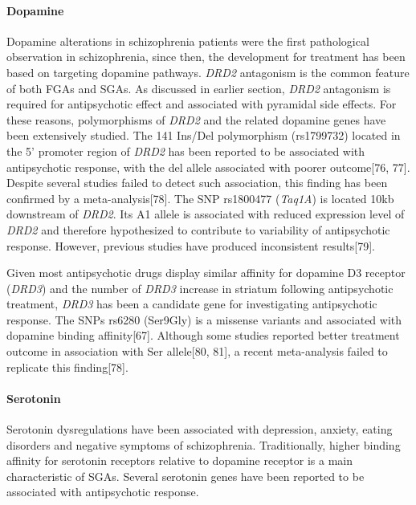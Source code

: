 \documentclass[12pt]{report}
\newcommand{\gene}[1]{\textit{#1}}
\begin{document}
			\paragraph{Dopamine}
				Dopamine alterations in schizophrenia patients were the first pathological observation in schizophrenia, since then, the development for treatment has been based on targeting dopamine pathways. 
				\gene{DRD2} antagonism is the common feature of both FGAs and SGAs.  
				As discussed in earlier section, \gene{DRD2} antagonism is required for antipsychotic effect and associated with pyramidal side effects. 
				For these reasons, polymorphisms of \gene{DRD2} and the related dopamine genes have been extensively studied.
				The 141 Ins/Del polymorphism (rs1799732) located in the 5' promoter region of \gene{DRD2} has been reported to be associated with antipsychotic response, with the del allele associated with poorer outcome[76, 77]. 
				Despite several studies failed to detect such association, this finding has been confirmed by a meta-analysis[78].  
				The SNP rs1800477 (\gene{Taq1A}) is located 10kb downstream of \gene{DRD2}. 
				Its A1 allele is associated with reduced expression level of \gene{DRD2} and therefore hypothesized to contribute to variability of antipsychotic response. 
				However, previous studies have produced inconsistent results[79]. 
				
				Given most antipsychotic drugs display similar affinity for dopamine D3 receptor (\gene{DRD3})   and the number of \gene{DRD3} increase in striatum following antipsychotic treatment, \gene{DRD3} has been a candidate gene for investigating antipsychotic response. 
				The SNPs rs6280 (Ser9Gly) is a missense variants and associated with dopamine binding affinity[67]. 
				Although some studies reported better treatment outcome in association with Ser allele[80, 81], a recent meta-analysis failed to replicate this finding[78].  
			\paragraph{Serotonin}
				Serotonin dysregulations have been associated with depression, anxiety, eating disorders and negative symptoms of schizophrenia. 
				Traditionally, higher binding affinity for serotonin receptors relative to dopamine receptor is a main characteristic of SGAs. 
				Several serotonin genes have been reported to be associated with antipsychotic response. 
				
\end{document}
